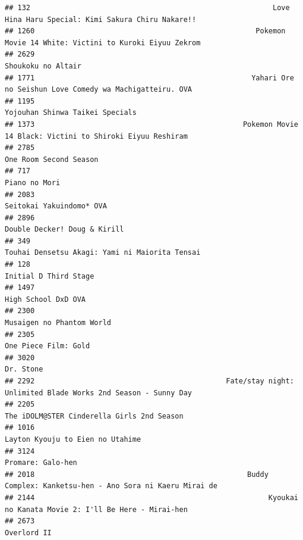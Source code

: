 \documentclass[
]{article}
\begin{document}
\begin{verbatim}
## 132                                                         Love Hina Haru Special: Kimi Sakura Chiru Nakare!!
## 1260                                                    Pokemon Movie 14 White: Victini to Kuroki Eiyuu Zekrom
## 2629                                                                                        Shoukoku no Altair
## 1771                                                   Yahari Ore no Seishun Love Comedy wa Machigatteiru. OVA
## 1195                                                                           Yojouhan Shinwa Taikei Specials
## 1373                                                 Pokemon Movie 14 Black: Victini to Shiroki Eiyuu Reshiram
## 2785                                                                                    One Room Second Season
## 717                                                                                              Piano no Mori
## 2083                                                                                  Seitokai Yakuindomo* OVA
## 2896                                                                              Double Decker! Doug & Kirill
## 349                                                             Touhai Densetsu Akagi: Yami ni Maiorita Tensai
## 128                                                                                      Initial D Third Stage
## 1497                                                                                       High School DxD OVA
## 2300                                                                                 Musaigen no Phantom World
## 2305                                                                                      One Piece Film: Gold
## 3020                                                                                                 Dr. Stone
## 2292                                             Fate/stay night: Unlimited Blade Works 2nd Season - Sunny Day
## 2205                                                                The iDOLM@STER Cinderella Girls 2nd Season
## 1016                                                                          Layton Kyouju to Eien no Utahime
## 3124                                                                                         Promare: Galo-hen
## 2018                                                  Buddy Complex: Kanketsu-hen - Ano Sora ni Kaeru Mirai de
## 2144                                                       Kyoukai no Kanata Movie 2: I'll Be Here - Mirai-hen
## 2673                                                                                               Overlord II

\end{verbatim}
\end{document}
